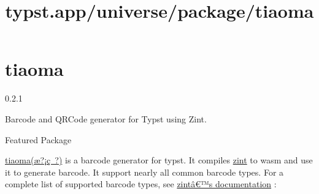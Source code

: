 \title{typst.app/universe/package/tiaoma}

\label{banner}
\section{tiaoma}\label{tiaoma}

{ 0.2.1 }

Barcode and QRCode generator for Typst using Zint.

{ } Featured Package

\label{readme}
\href{https://github.com/enter-tainer/zint-wasi}{tiaoma(æ?¡ç~?)} is a
barcode generator for typst. It compiles
\href{https://github.com/zint/zint}{zint} to wasm and use it to generate
barcode. It support nearly all common barcode types. For a complete list
of supported barcode types, see \href{https://zint.org.uk/}{zintâ€™s
documentation} :

